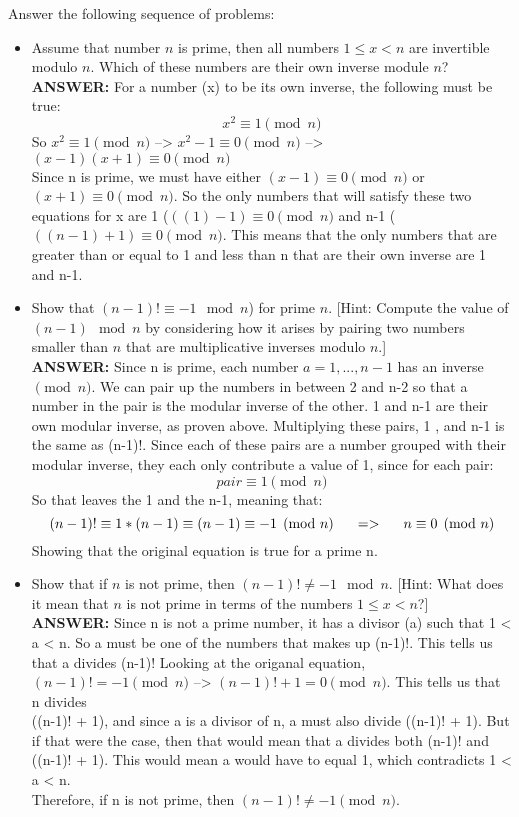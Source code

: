 \documentclass{article}
\begin{document}
 Answer the following sequence of problems:
\begin{itemize}

\item Assume that number $n$ is prime, then all numbers $1 \leq x < n$
  are invertible modulo $n$. Which of these numbers are their own
  inverse module $n$?\\

{\bfseries ANSWER: }For a number (x) to be its own inverse, the following must be true:
$$x^{2} \equiv 1 \pmod{n}$$
So $x^{2} \equiv 1 \pmod{n}$ --> $x^{2}-1 \equiv 0 \pmod{n}$
--> $(x-1)(x+1) \equiv 0 \pmod{n}$\\
Since n is prime, we must have either $(x-1) \equiv 0 \pmod{n}$
or $(x+1) \equiv 0 \pmod{n}$. So the only numbers that will satisfy 
these two equations for x are 1 ($((1)-1) \equiv 0 \pmod{n}$ and 
n-1 ($((n-1)+1) \equiv 0 \pmod{n}$. This means that the only numbers
that are greater than or equal to 1 and less than n that are their own
inverse are 1 and n-1.

\item Show that $(n-1)! \equiv -1 \mod n$) for prime $n$. [Hint:
  Compute the value of $(n-1) \mod n$ by considering how it arises by
  pairing two numbers smaller than $n$ that are multiplicative
  inverses modulo $n$.]\\

{\bfseries ANSWER: }Since n is prime, each number $a = {1, ... , n-1}$ has an inverse $\pmod{n}$. 
We can pair up the numbers in between 2 and n-2 so that a number in the pair
is the modular inverse of the other. 1 and n-1 are their own modular inverse, as proven above.
Multiplying these pairs, 1 , and n-1 is the same as (n-1)!. Since each of these pairs
are a number grouped with their modular inverse, they each only contribute a value of 1,
since for each pair:
$$pair \equiv 1 \pmod{n}$$
So that leaves the 1 and the n-1, meaning that:
$$(n-1)! \equiv 1 * (n-1) \equiv (n-1) \equiv -1 \pmod{n} \hspace{.2in}=> \hspace{.2in} n \equiv 0 \pmod{n}$$
Showing that the original equation is true for a prime n.


\item Show that if $n$ is not prime, then $(n-1)! \neq -1 \mod
  n$. [Hint: What does it mean that $n$ is not prime in terms of the
    numbers $1 \leq x < n$?]\\

{\bfseries ANSWER: }Since n is not a prime number, it has a divisor (a) such that 1 < a < n.
So a must be one of the numbers that makes up (n-1)!. This tells us that
a divides (n-1)! Looking at the origanal equation, $(n-1)! = -1 \pmod{n}$
--> $(n-1)!+1 = 0 \pmod{n}$. This tells us that n divides\\((n-1)! + 1), and since
a is a divisor of n, a must also divide ((n-1)! + 1). But if that were the case, then
that would mean that a divides both (n-1)! and ((n-1)! + 1). This would mean a would 
have to equal 1, which contradicts 1 < a < n.\\Therefore, if n is not prime, then
$(n-1)! \neq -1 \pmod{n}$.


\end{itemize}
\end{document}
